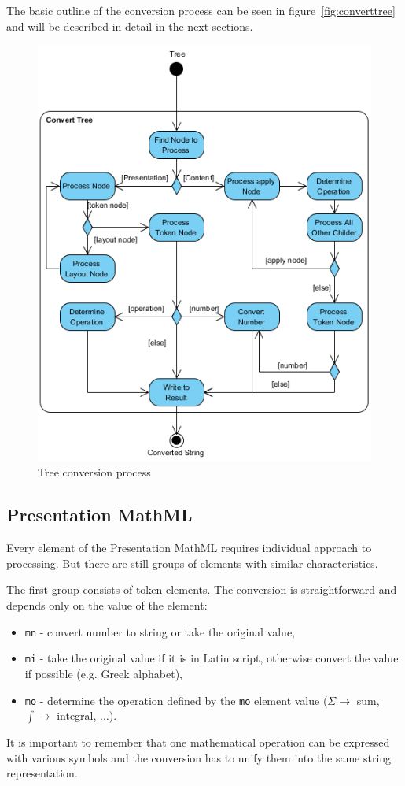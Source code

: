 \documentclass[11pt,oneside,final]{fithesis2}
\begin{document}
The basic outline of the conversion process can be seen in figure~\vref{fig:converttree} and will be described in detail in the next sections.

\begin{figure}[!ht]
\centering
\includegraphics{activity_diagram_tree}
\caption{Tree conversion process}
\label{fig:converttree}
\end{figure}

\subsection{Presentation MathML}
Every element of the Presentation MathML requires individual approach to processing. But there are still groups of elements with similar characteristics. 

The first group consists of token elements. The conversion is straightforward and depends only on the value of the element:
\begin{itemize}
\item \texttt{mn} - convert number to string or take the original value,
\item \texttt{mi} - take the original value if it is in Latin script, otherwise convert the value if possible (e.g. Greek alphabet),
\item \texttt{mo} - determine the operation defined by the \texttt{mo} element value ($\Sigma \rightarrow$ sum, $\int \rightarrow$ integral, $\ldots$).
\end{itemize}
It is important to remember that one mathematical operation can be expressed with various symbols and the conversion has to unify them into the same string representation.
\end{document}
